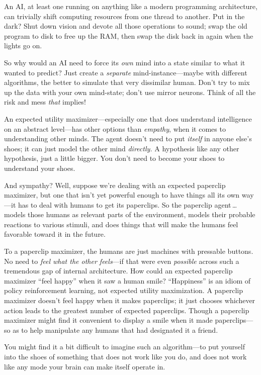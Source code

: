  An AI, at least one running on anything like a modern programming
architecture, can trivially shift computing resources from one thread
to another. Put in the dark? Shut down vision and devote all those
operations to sound; swap the old program to disk to free up the RAM,
then swap the disk back in again when the lights go on.


 So why would an AI need to force its \textit{own} mind into a
state similar to what it wanted to predict? Just create a
\textit{separate} mind-instance---maybe with different algorithms, the
better to simulate that very dissimilar human. Don't
try to mix up the data with your own mind-state; don't
use mirror neurons. Think of all the risk and mess \textit{that}
implies!


 An expected utility maximizer---especially one that does
understand intelligence on an abstract level---has other options than
\textit{empathy}, when it comes to understanding other minds. The agent
doesn't need to put \textit{itself} in anyone
else's shoes; it can just model the other mind
\textit{directly.} A hypothesis like any other hypothesis, just a
little bigger. You don't need to become your shoes to
understand your shoes.


 And sympathy? Well, suppose we're dealing with an
expected paperclip maximizer, but one that isn't yet
powerful enough to have things all its own way---it has to deal with
humans to get its paperclips. So the paperclip agent\,\ldots models those
humans as relevant parts of the environment, models their probable
reactions to various stimuli, and does things that will make the humans
feel favorable toward it in the future.


 To a paperclip maximizer, the humans are just machines with
pressable buttons. No need to \textit{feel what the other feels}{}---if
that were even \textit{possible} across such a tremendous gap of
internal architecture. How could an expected paperclip maximizer
``feel happy'' when it saw a human
smile? ``Happiness'' is an idiom of
policy reinforcement learning, not expected utility maximization. A
paperclip maximizer doesn't feel happy when it makes
paperclips; it just chooses whichever action leads to the greatest
number of expected paperclips. Though a paperclip maximizer might find
it convenient to display a smile when it made paperclips---so as to
help manipulate any humans that had designated it a friend.


 You might find it a bit difficult to imagine such an
algorithm---to put yourself into the shoes of something that does not
work like you do, and does not work like any mode your brain can make
itself operate in.


